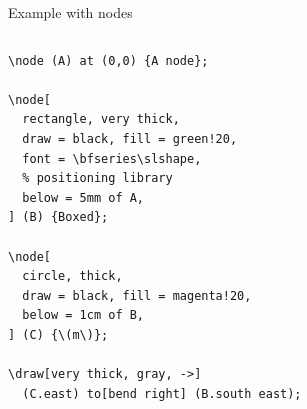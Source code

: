 \documentclass[xetex, onlymath, handout]{beamer}
\begin{document}
\begin{frame}[fragile]{Example with nodes}
  \begin{columns}
    \begin{column}{.8\linewidth}
      \begin{lstlisting}
\node (A) at (0,0) {A node};

\node[
  rectangle, very thick,
  draw = black, fill = green!20,
  font = \bfseries\slshape,
  % positioning library
  below = 5mm of A,
] (B) {Boxed};

\node[
  circle, thick,
  draw = black, fill = magenta!20,
  below = 1cm of B,
] (C) {\(m\)};

\draw[very thick, gray, ->]
  (C.east) to[bend right] (B.south east);
      \end{lstlisting}
    \end{column}
    \begin{column}{.2\linewidth}
      \centering
    \end{column}
  \end{columns}
\end{frame}
\end{document}
